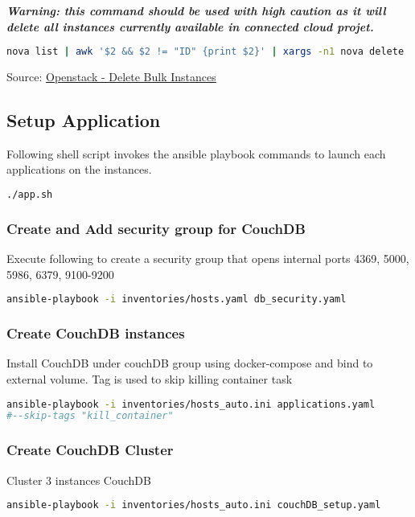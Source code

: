 \textit{\textbf{Warning: this command should be used with high caution as it will delete all instances currently available in connected cloud projet.}}  
\begin{lstlisting}[language=bash]
nova list | awk '$2 && $2 != "ID" {print $2}' | xargs -n1 nova delete
\end{lstlisting}
Source: \href{https://maestropandy.wordpress.com/2016/08/24/openstack-delete-bulk-instances/}{Openstack - Delete Bulk Instances}  


\subsection{Setup Application}
Following shell script invokes the ansible playbook commands to launch each applications on the instances. 

\begin{lstlisting}[language=bash]
./app.sh
\end{lstlisting}

\subsubsection{Create and Add security group for CouchDB }
Execute following to create a security group that opens internal ports 4369, 5000, 5986, 6379, 9100-9200
\begin{lstlisting}[language=bash]
ansible-playbook -i inventories/hosts.yaml db_security.yaml 
\end{lstlisting}

\subsubsection{Create CouchDB instances }
Install CouchDB under couchDB group using docker-compose and bind to external volume. Tag is used to skip killing container task
\begin{lstlisting}[language=bash]
ansible-playbook -i inventories/hosts_auto.ini applications.yaml
#--skip-tags "kill_container"
\end{lstlisting}

\subsubsection{Create CouchDB Cluster }
Cluster 3 instances CouchDB
\begin{lstlisting}[language=bash]
ansible-playbook -i inventories/hosts_auto.ini couchDB_setup.yaml  
\end{lstlisting}

